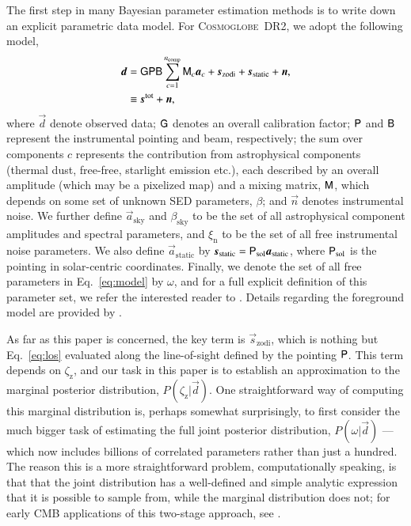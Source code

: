 \documentclass[twocolumn]{aa}
\newcommand{\dv}[0]{\vec{d}}
\newcommand{\B}[0]{\tens{B}}
\newcommand{\G}[0]{\tens{G}}
\newcommand{\n}[0]{\vec{n}}
\newcommand{\s}[0]{\vec{s}}
\renewcommand{\a}[0]{\vec{a}}
\newcommand{\M}[0]{\tens{M}}
\renewcommand{\P}[0]{\tens{P}}
\newcommand{\cosmoglobe}{\textsc{Cosmoglobe}}
\begin{document}
The first step in many Bayesian parameter estimation methods is to
write down an explicit parametric data model. For \cosmoglobe\ DR2, we
adopt the following model,
\begin{align}
	\label{eq:model}
	\dv &=\G\P\B\sum_{c=1}^{n_{\mathrm{comp}}}\M_c\a_c+\s_{\mathrm{zodi}} +
          \s_{\mathrm{static}} + \n,\\
        &\equiv \s^{\mathrm{tot}} + \n,
\end{align}
where $\dv$ denote observed data; $\G$ denotes an overall calibration
factor; $\P$ and $\B$ represent the instrumental pointing and beam,
respectively; the sum over components $c$ represents the contribution
from astrophysical components (thermal dust, free-free, starlight
emission etc.), each described by an overall amplitude (which may be a
pixelized map) and a mixing matrix, $\M$, which depends on some set of
unknown SED parameters, $\beta$; and $\n$ denotes instrumental
noise. We further define $\a_{\mathrm{sky}}$ and
$\beta_{\mathrm{sky}}$ to be the set of all astrophysical component
amplitudes and spectral parameters, and $\xi_{\mathrm{n}}$ to be the
set of all free instrumental noise parameters. We also define
$\a_{\mathrm{static}}$ by
$\s_{\mathrm{static}}=\P_{\mathrm{sol}}\a_{\mathrm{static}}$, where
$\P_{\mathrm{sol}}$ is the pointing in solar-centric
coordinates. Finally, we denote the set of all free parameters in
Eq.~\eqref{eq:model} by $\omega$, and for a full explicit definition
of this parameter set, we refer the interested reader to
\citet{CG02_01}. Details regarding the foreground model are provided
by \citet{CG02_04,CG02_05}.

As far as this paper is concerned, the key term is
$\s_{\mathrm{zodi}}$, which is nothing but Eq.~\eqref{eq:los}
evaluated along the line-of-sight defined by the pointing $\P$. This
term depends on $\zeta_{\mathrm{z}}$, and our task in this paper is to
establish an approximation to the marginal posterior distribution,
$P(\zeta_{\mathrm{z}}|\dv)$. One straightforward way of computing this
marginal distribution is, perhaps somewhat surprisingly, to first
consider the much bigger task of estimating the full joint posterior
distribution, $P(\omega|\dv)$ --- which now includes billions of
correlated parameters rather than just a hundred. The reason this is a 
more straightforward problem, computationally speaking, is that
that the joint distribution has a well-defined and simple analytic expression that it
is possible to sample from, while the marginal distribution does not;
for early CMB applications of this two-stage approach, see
\citet{jewell2004,wandelt2004,eriksen:2004}.
\end{document}
